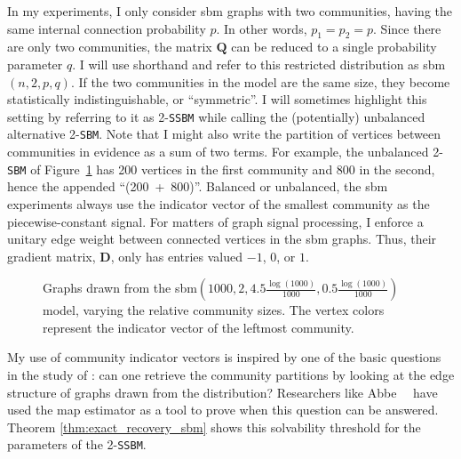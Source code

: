 In my experiments, I only consider \acrshort{sbm} graphs with two communities, having the same internal connection probability $p$. In other words, $p_1 = p_2 = p$. Since there are only two communities, the matrix $\mathbf{Q}$ can be reduced to a single probability parameter $q$. I will use shorthand and refer to this restricted distribution as \acrshort{sbm}$(n, 2, p, q)$. If the two communities in the model are the same size, they become statistically indistinguishable, or ``symmetric''. I will sometimes highlight this setting by referring to it as 2-\texttt{SSBM} while calling the (potentially) unbalanced alternative 2-\texttt{SBM}. Note that I might also write the partition of vertices between communities in evidence as a sum of two terms. For example, the unbalanced 2-\texttt{SBM} of Figure~\ref{fig:2ssbm_and_2sbm} has 200 vertices in the first community and 800 in the second, hence the appended ``(200~+~800)''. Balanced or unbalanced, the \acrshort{sbm} experiments always use the indicator vector of the smallest community as the piecewise-constant signal. For matters of graph signal processing, I enforce a unitary edge weight between connected vertices in the \acrshort{sbm} graphs. Thus, their gradient matrix, $\mathbf{D}$, only has entries valued $-1$, $0$, or $1$.

\begin{figure}[H]
    \centering
    \hfill
    \caption[Graphs from 2-\texttt{SSBM}(500~+~500) and 2-\texttt{SBM}(200~+~800)]{Graphs drawn from the \acrshort{sbm}$\left(1000, 2, 4.5 \frac{\log (1000)}{1000}, 0.5 \frac{\log (1000)}{1000}\right)$ model, varying the relative community sizes. The vertex colors represent the indicator vector of the leftmost community.}
    \label{fig:2ssbm_and_2sbm}
\end{figure}

My use of community indicator vectors is inspired by one of the basic questions in the study of : can one retrieve the community partitions by looking at the edge structure of graphs drawn from the distribution? Researchers like Abbe~\etal~\cite{abbe2015, abbe2018} have used the \acrfull{map} estimator as a tool to prove when this question can be answered. Theorem \ref{thm:exact_recovery_sbm} shows this solvability threshold for the parameters of the 2-\texttt{SSBM}.

\clearpage

